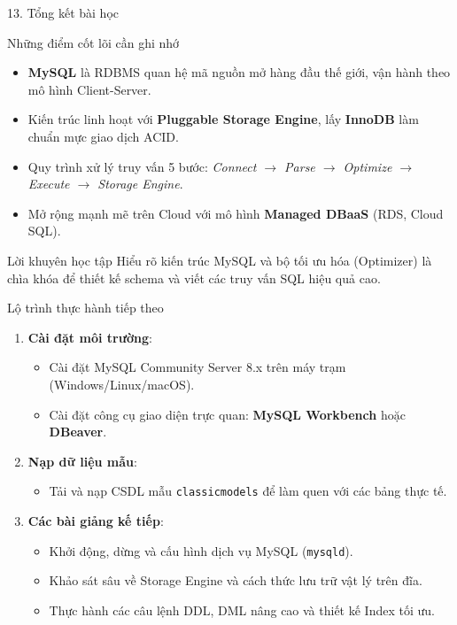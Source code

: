\documentclass[aspectratio=169,11pt]{beamer}
\newcommand{\kw}[1]{\textcolor{dbblue}{\textbf{#1}}}
\begin{document}
\begin{frame}{13. Tổng kết bài học}
\begin{block}{Những điểm cốt lõi cần ghi nhớ}
  \begin{itemize}\setlength{\itemsep}{2pt}\small
    \item \kw{MySQL} là RDBMS quan hệ mã nguồn mở hàng đầu thế giới, vận hành theo mô hình Client-Server.
    \item Kiến trúc linh hoạt với \kw{Pluggable Storage Engine}, lấy \kw{InnoDB} làm chuẩn mực giao dịch ACID.
    \item Quy trình xử lý truy vấn 5 bước: \textit{Connect $\rightarrow$ Parse $\rightarrow$ Optimize $\rightarrow$ Execute $\rightarrow$ Storage Engine}.
    \item Mở rộng mạnh mẽ trên Cloud với mô hình \kw{Managed DBaaS} (RDS, Cloud SQL).
  \end{itemize}
\end{block}

\begin{alertblock}{Lời khuyên học tập}
  \small
  Hiểu rõ kiến trúc MySQL và bộ tối ưu hóa (Optimizer) là chìa khóa để thiết kế schema và viết các truy vấn SQL hiệu quả cao.
\end{alertblock}
\end{frame}

\begin{frame}{Lộ trình thực hành tiếp theo}
\begin{enumerate}\setlength{\itemsep}{6pt}
  \item \textbf{Cài đặt môi trường}:
    \begin{itemize}
      \item Cài đặt MySQL Community Server 8.x trên máy trạm (Windows/Linux/macOS).
      \item Cài đặt công cụ giao diện trực quan: \kw{MySQL Workbench} hoặc \kw{DBeaver}.
    \end{itemize}
  \item \textbf{Nạp dữ liệu mẫu}:
    \begin{itemize}
      \item Tải và nạp CSDL mẫu \texttt{classicmodels} để làm quen với các bảng thực tế.
    \end{itemize}
  \item \textbf{Các bài giảng kế tiếp}:
    \begin{itemize}
      \item Khởi động, dừng và cấu hình dịch vụ MySQL (\texttt{mysqld}).
      \item Khảo sát sâu về Storage Engine và cách thức lưu trữ vật lý trên đĩa.
      \item Thực hành các câu lệnh DDL, DML nâng cao và thiết kế Index tối ưu.
    \end{itemize}
\end{enumerate}
\end{frame}
\end{document}
